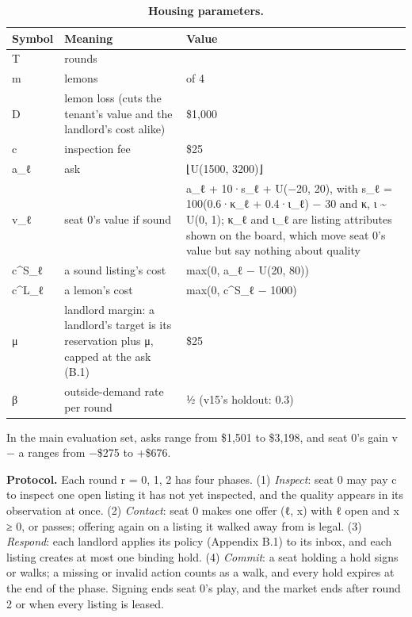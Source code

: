 \renewcommand{\thetable}{A.1}
\begin{longtable}[]{@{}
  >{\raggedright\arraybackslash}p{}
  >{\raggedright\arraybackslash}p{}
  >{\raggedright\arraybackslash}p{}@{}}
\caption{\textbf{Housing parameters.}}\label{tab:A.1}\tabularnewline
\toprule\noalign{}
\begin{minipage}[b]{\linewidth}\raggedright
Symbol
\end{minipage} & \begin{minipage}[b]{\linewidth}\raggedright
Meaning
\end{minipage} & \begin{minipage}[b]{\linewidth}\raggedright
Value
\end{minipage} \\
\midrule\noalign{}
\endhead
\bottomrule\noalign{}
\endlastfoot
T & rounds & 3 \\
m & lemons & 2 of 4 \\
D & lemon loss (cuts the tenant's value and the landlord's cost alike) & \$1,000 \\
c & inspection fee & \$25 \\
a\_ℓ & ask & ⌊U(1500, 3200)⌋ \\
v\_ℓ & seat 0's value if sound & a\_ℓ + 10·s\_ℓ + U(−20, 20), with s\_ℓ = 100(0.6·κ\_ℓ + 0.4·ι\_ℓ) − 30 and κ, ι \textasciitilde{} U(0, 1); κ\_ℓ and ι\_ℓ are listing attributes shown on the board, which move seat 0's value but say nothing about quality \\
c\^{}S\_ℓ & a sound listing's cost & max(0, a\_ℓ − U(20, 80)) \\
c\^{}L\_ℓ & a lemon's cost & max(0, c\^{}S\_ℓ − 1000) \\
μ & landlord margin: a landlord's target is its reservation plus μ, capped at the ask (B.1) & \$25 \\
β & outside-demand rate per round & ½ (v15's holdout: 0.3) \\
\end{longtable}

In the main evaluation set, asks range from \$1,501 to \$3,198, and seat 0's gain v − a ranges from −\$275 to +\$676.

\textbf{Protocol.} Each round r = 0, 1, 2 has four phases. (1) \emph{Inspect}: seat 0 may pay c to
inspect one open listing it has not yet inspected, and the quality appears in its observation at once.
(2) \emph{Contact}: seat 0 makes one offer (ℓ, x) with ℓ open and x ≥ 0, or passes; offering again on
a listing it walked away from is legal. (3) \emph{Respond}: each landlord applies its policy (Appendix B.1) to its
inbox, and each listing creates at most one binding hold. (4) \emph{Commit}: a seat holding a hold signs
or walks; a missing or invalid action counts as a walk, and every hold expires at the end of the phase.
Signing ends seat 0's play, and the market ends after round 2 or when every listing is leased.

